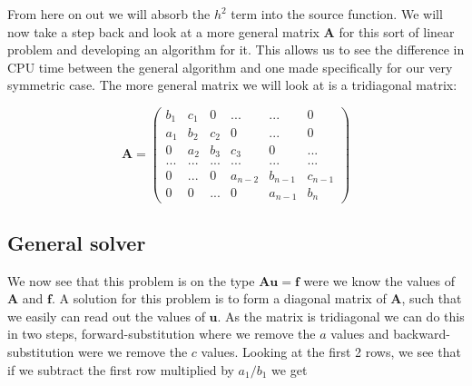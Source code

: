 \documentclass[a4paper,11pt]{article}
\begin{document}
{From here on out we will absorb the $h^2$ term into the source function. We will now take a step back and look at a more general matrix $\mathbf{A}$ for this sort of linear problem and developing an algorithm for it. This allows us to see the difference in CPU time between the general algorithm and one made specifically for our very symmetric case. The more general matrix we will look at is a tridiagonal matrix:
		
\begin{equation}
\mathbf{A} = \begin{pmatrix}
b_1 & c_1 & 0 & ... & ... & 0 \\
a_1 & b_2 & c_2 & 0 & ... & 0 \\
0 & a_2 & b_3 & c_3 & 0 & ... \\
... & ... & ... & ... & ... & ... \\
0 & ... & 0 & a_{n-2} & b_{n-1} & c_{n-1} \\
0 & 0 & ... & 0 & a_{n-1} & b_{n} 
\end{pmatrix}
\label{general_tridiagonal_matrix}
\end{equation}
		
		\subsection{General solver}
We now see that this problem is on the type $\mathbf{A}\mathbf{u}=\mathbf{f}$ were we know the values of $\mathbf{A}$ and $\mathbf{f}$. A solution for this problem is to form a diagonal matrix of $\mathbf{A}$, such that we easily can read out the values of $\mathbf{u}$. As the matrix is tridiagonal we can do this in two steps, forward-substitution where we remove the $a$ values and backward-substitution were we remove the $c$ values. Looking at the first 2 rows, we see that if we subtract the first row multiplied by $a_1/b_1$ we get
		
}
\end{document}
